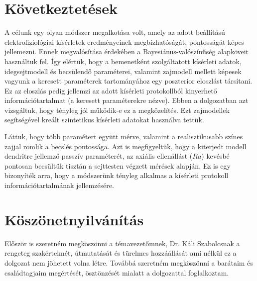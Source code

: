 \section{Következtetések}
A célunk egy olyan módszer megalkotása volt, amely az adott beállítású elektrofiziológiai kísérletek eredményeinek megbízhatóságát, pontosságát képes jellemezni. Ennek megvalósítása érdekében a Bayesiánus-valószínűség alapköveit használtuk fel. Így elértük, hogy a bemenetként szolgáltatott kísérleti adatok, idegsejtmodell és becsülendő paraméterei, valamint zajmodell mellett képesek vagyunk a keresett paraméterek tartományához egy poszterior eloszlást társítani. Ez az eloszlás pedig jellemzi az adott kísérleti protokollból kinyerhető információtartalmat (a keresett paraméterekre nézve). Ebben a dolgozatban azt vizsgáltuk, hogy tényleg jól működik-e ez a megközelítés. Ezt zajmodellek segítségével kreált szintetikus kísérleti adatokat használva tettük.

Láttuk, hogy több paramétert együtt mérve, valamint a realisztikusabb színes zajjal romlik a becslés pontossága. Azt is megfigyeltük, hogy a kiterjedt modell dendritre jellemző passzív paraméterét, az axiális ellenállást ($Ra$) kevésbé pontosan becsültük tisztán a sejttesten végzett mérések alapján. Ez is egy bizonyíték arra, hogy a módszerünk tényleg alkalmas a kísérleti protokoll információtartalmának jellemzésére.


\section*{Köszönetnyilvánítás} 
Először is szeretném megköszönni a témavezetőmnek, Dr. Káli Szabolcsnak a rengeteg szakértelmét, útmutatását és türelmes hozzáállását ami nélkül ez a dolgozat nem jöhetett volna létre. Továbbá szeretném megköszönni a barátaim és családtagjaim megértését, ösztönzését mialatt a dolgozattal foglalkoztam.